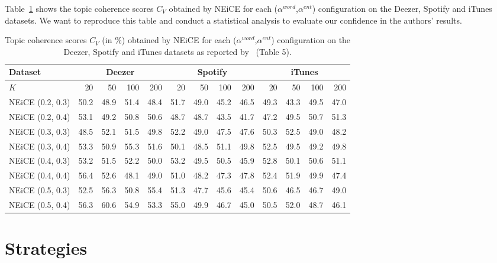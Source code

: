 \documentclass[manuscript]{acmart}
\begin{document}
Table~\ref{tab:authors-results} shows the topic coherence scores $C_V$ obtained by NEiCE for each ($\alpha^{word}$,$\alpha^{ent}$) configuration on the Deezer, Spotify and iTunes datasets. We want to reproduce this table and conduct a statistical analysis to evaluate our confidence in the authors' results.

\begin{table}[h]
  \centering
  \begin{tabular}{l|rrrr|rrrr|rrrr}
      \toprule
      Dataset & \multicolumn{4}{c}{Deezer} & \multicolumn{4}{c}{Spotify} & \multicolumn{4}{c}{iTunes} \\
      \hline
      $K$ & 20 & 50 & 100 & 200 & 20 & 50 & 100 & 200 & 20 & 50 & 100 & 200 \\
      \hline
      NEiCE (0.2, 0.3) & 50.2 & 48.9 & 51.4 & 48.4 & 51.7 & 49.0 & 45.2 & 46.5 & 49.3 & 43.3 & 49.5 & 47.0 \\
      NEiCE (0.2, 0.4) & 53.1 & 49.2 & 50.8 & 50.6 & 48.7 & 48.7 & 43.5 & 41.7 & 47.2 & 49.5 & 50.7 & 51.3 \\
      NEiCE (0.3, 0.3) & 48.5 & 52.1 & 51.5 & 49.8 & 52.2 & 49.0 & 47.5 & 47.6 & 50.3 & 52.5 & 49.0 & 48.2 \\
      NEiCE (0.3, 0.4) & 53.3 & 50.9 & 55.3 & 51.6 & 50.1 & 48.5 & 51.1 & 49.8 & 52.5 & 49.5 & 49.2 & 49.8 \\
      NEiCE (0.4, 0.3) & 53.2 & 51.5 & 52.2 & 50.0 & 53.2 & 49.5 & 50.5 & 45.9 & 52.8 & 50.1 & 50.6 & 51.1 \\
      NEiCE (0.4, 0.4) & 56.4 & 52.6 & 48.1 & 49.0 & 51.0 & 48.2 & 47.3 & 47.8 & 52.4 & 51.9 & 49.9 & 47.4 \\
      NEiCE (0.5, 0.3) & 52.5 & 56.3 & 50.8 & 55.4 & 51.3 & 47.7 & 45.6 & 45.4 & 50.6 & 46.5 & 46.7 & 49.0 \\
      NEiCE (0.5, 0.4) & 56.3 & 60.6 & 54.9 & 53.3 & 55.0 & 49.9 & 46.7 & 45.0 & 50.5 & 52.0 & 48.7 & 46.1 \\
      \bottomrule
  \end{tabular}
  \caption{Topic coherence scores $C_V$ (in \%) obtained by NEiCE for each ($\alpha^{word}$,$\alpha^{ent}$) configuration on the Deezer, Spotify and iTunes datasets as reported by~\citet{valero2022topic} (Table 5).}
  \label{tab:authors-results}
\end{table}

\section{Strategies}
\end{document}
